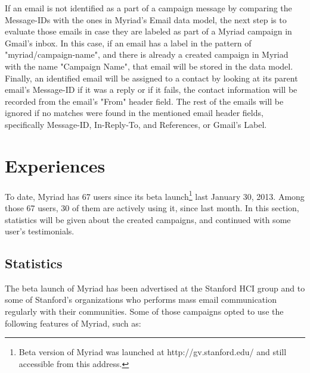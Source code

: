 If an email is not identified as a part of a campaign message by comparing the Message-IDs with the ones in Myriad's Email data model, the next step is to evaluate those emails in case they are labeled as part of a Myriad campaign in Gmail's inbox. In this case, if an email has a label in the pattern of "myriad/campaign-name", and there is already a created campaign in Myriad with the name "Campaign Name", that email will be stored in the data model. Finally, an identified email will be assigned to a contact by looking at its parent email's Message-ID if it was a reply or if it fails, the contact information will be recorded from the email's "From" header field. The rest of the emails will be ignored if no matches were found in the mentioned email header fields, specifically Message-ID, In-Reply-To, and References, or Gmail's Label.

\section{Experiences}
\label{sec:5.4:Expr}

To date, Myriad has 67 users since its beta launch\footnote{Beta version of Myriad was launched at http://gv.stanford.edu/ and still accessible from this address.} last January 30, 2013. Among those 67 users, 30 of them are actively using it, since last month. In this section, statistics will be given about the created campaigns, and continued with some user's testimonials.

\subsection{Statistics}
\label{subsec:5.4.1:Stat}

The beta launch of Myriad has been advertised at the Stanford \ac{HCI} group and to some of Stanford's organizations who performs mass email communication regularly with their communities. Some of those campaigns opted to use the following features of Myriad, such as:

